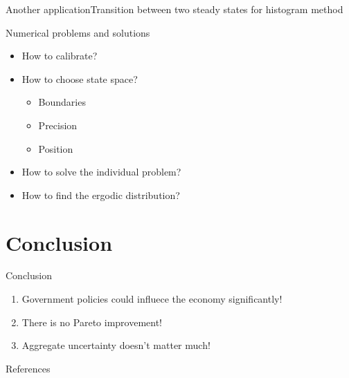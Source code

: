 \documentclass{beamer}
\begin{document}
\begin{frame}{Another application}{Transition between two steady states for histogram method}
\end{frame}

\begin{frame}{Numerical problems and solutions}
  \begin{itemize}

  \item {
  How to calibrate?
  }

  

  \item {
  How to choose state space?

  \begin{itemize}
    \item Boundaries
    \item {
    Precision  
    }
    \item {
    Position  
    }
  \end{itemize}

  }

 
  \item {
  How to solve the individual problem?  
  }
  
  
  \item {
  How to find the ergodic distribution?  
  }
 



  \end{itemize}
\end{frame}


\section{Conclusion}
\begin{frame}{Conclusion}
  \begin{enumerate}

  \item {
  Government policies could influece the economy significantly!
  }

  \item {
  There is no Pareto improvement!
  }

  \item {
  Aggregate uncertainty doesn't matter much!
  }

  \end{enumerate}
\end{frame}

\appendix

\begin{frame}[allowframebreaks]{References}

\printbibliography
\end{frame}
\end{document}
